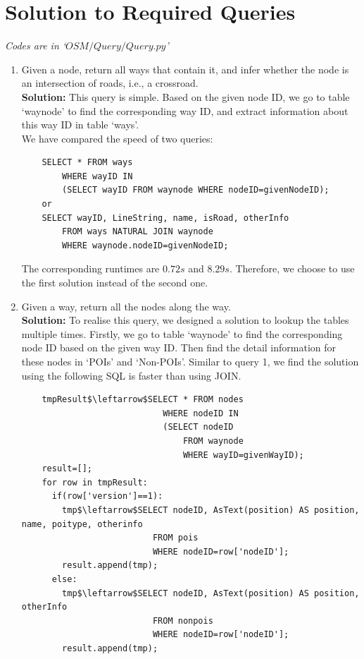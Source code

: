 \documentclass[final,1p,times]{elsarticle}
\begin{document}
\section{Solution to Required Queries}
\emph{Codes are in `$OSM/Query/Query.py$'}
\begin{enumerate}
  \item Given a node, return all ways that contain it, and infer whether the node is an intersection of roads, i.e., a crossroad.\\
  \textbf{Solution:} This query is simple. Based on the given node ID, we go to table `waynode' to find the corresponding way ID, and extract information about this way ID in table `ways'.\\
  We have compared the speed of two queries:
  \begin{verbatim}
    SELECT * FROM ways 
        WHERE wayID IN 
        (SELECT wayID FROM waynode WHERE nodeID=givenNodeID);
    or
    SELECT wayID, LineString, name, isRoad, otherInfo 
        FROM ways NATURAL JOIN waynode 
        WHERE waynode.nodeID=givenNodeID;
  \end{verbatim}
  The corresponding runtimes are $0.72 s$ and $8.29 s$. Therefore, we choose to use the first solution instead of the second one. 
  \item Given a way, return all the nodes along the way.\\
  \textbf{Solution:} To realise this query, we designed a solution to lookup the tables multiple times. Firstly, we go to table `waynode' to find the corresponding node ID based on the given way ID. Then find the detail information for these nodes in `POIs' and `Non-POIs'.
  Similar to query 1, we find the solution using the following SQL is faster than using JOIN.
  \begin{verbatim}
    tmpResult$\leftarrow$SELECT * FROM nodes 
                            WHERE nodeID IN 
                            (SELECT nodeID 
                                FROM waynode 
                                WHERE wayID=givenWayID);
    result=[];
    for row in tmpResult:
      if(row['version']==1):
        tmp$\leftarrow$SELECT nodeID, AsText(position) AS position, name, poitype, otherinfo 
                          FROM pois 
                          WHERE nodeID=row['nodeID'];
        result.append(tmp);
      else:
        tmp$\leftarrow$SELECT nodeID, AsText(position) AS position, otherInfo 
                          FROM nonpois 
                          WHERE nodeID=row['nodeID'];
        result.append(tmp);
  \end{verbatim}

\end{enumerate}
\end{document}
